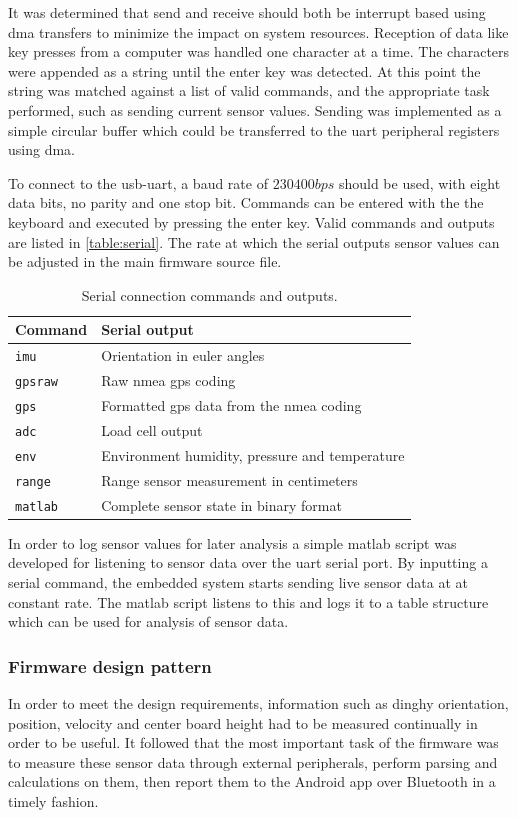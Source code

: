 It was determined that send and receive should both be interrupt based using \gls{dma} transfers to minimize the impact on system resources. Reception of data like key presses from a computer was handled one character at a time. The characters were appended as a string until the enter key was detected. At this point the string was matched against a list of valid commands, and the appropriate task performed, such as sending current sensor values. Sending was implemented as a simple circular buffer which could be transferred to the \gls{uart} peripheral registers using \gls{dma}.

To connect to the \gls{usb}-\gls{uart}, a baud rate of $230400bps$ should be used, with eight data bits, no parity and one stop bit. Commands can be entered with the the keyboard and executed by pressing the enter key. Valid commands and outputs are listed in \autoref{table:serial}. The rate at which the serial outputs sensor values can be adjusted in the main firmware source file.
\begin{table}[H]
\centering
\begin{tabular}{ l | l }
 	Command 		& Serial output \\
  	\hline
  	\texttt{imu} 		& Orientation in euler angles \\
  	\texttt{gpsraw} 	& Raw \gls{nmea} \gls{gps} coding\\
  	\texttt{gps} 		& Formatted \gls{gps} data from the \gls{nmea} coding\\
  	\texttt{adc} 		& Load cell output\\
  	\texttt{env} 		& Environment humidity, pressure and temperature \\
  	\texttt{range} 	& Range sensor measurement in centimeters \\
  	\texttt{matlab} 	& Complete sensor state in binary format \\
\end{tabular}
\caption{Serial connection commands and outputs.}
\label{table:serial}
\end{table}

In order to log sensor values for later analysis a simple \gls{matlab} script was developed for listening to sensor data over the \gls{uart} serial port. By inputting a serial command, the embedded system starts sending live sensor data at at constant rate. The \gls{matlab} script listens to this and logs it to a table structure which can be used for analysis of sensor data.

\subsubsection{Firmware design pattern}
In order to meet the design requirements, information such as dinghy orientation, position, velocity and center board height had to be measured continually in order to be useful. It followed that the most important task of the firmware was to measure these sensor data through external peripherals, perform parsing and calculations on them, then report them to the Android app over Bluetooth in a timely fashion. 

